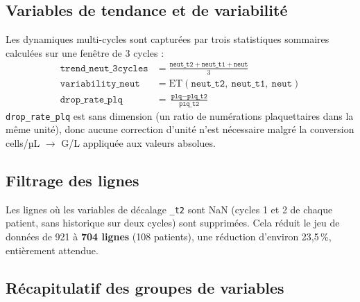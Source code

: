 \documentclass[12pt,a4paper]{report}
\begin{document}
\subsection{Variables de tendance et de variabilité}

Les dynamiques multi-cycles sont capturées par trois statistiques sommaires calculées sur une fenêtre de 3 cycles :
\begin{align}
  \texttt{trend\_neut\_3cycles} &= \frac{\texttt{neut\_t2} + \texttt{neut\_t1} + \texttt{neut}}{3} \\
  \texttt{variability\_neut}    &= \text{ET}(\texttt{neut\_t2},\ \texttt{neut\_t1},\ \texttt{neut}) \\
  \texttt{drop\_rate\_plq}      &= \frac{\texttt{plq} - \texttt{plq\_t2}}{\texttt{plq\_t2}}
\end{align}
\texttt{drop\_rate\_plq} est sans dimension (un ratio de numérations plaquettaires dans la même unité), donc aucune correction d'unité n'est nécessaire malgré la conversion cells/µL $\to$ G/L appliquée aux valeurs absolues.

\subsection{Filtrage des lignes}

Les lignes où les variables de décalage \texttt{\_t2} sont NaN (cycles 1 et 2 de chaque patient, sans historique sur deux cycles) sont supprimées. Cela réduit le jeu de données de 921 à \textbf{704 lignes} (108 patients), une réduction d'environ 23,5\,\%, entièrement attendue.

\subsection{Récapitulatif des groupes de variables}
\end{document}
